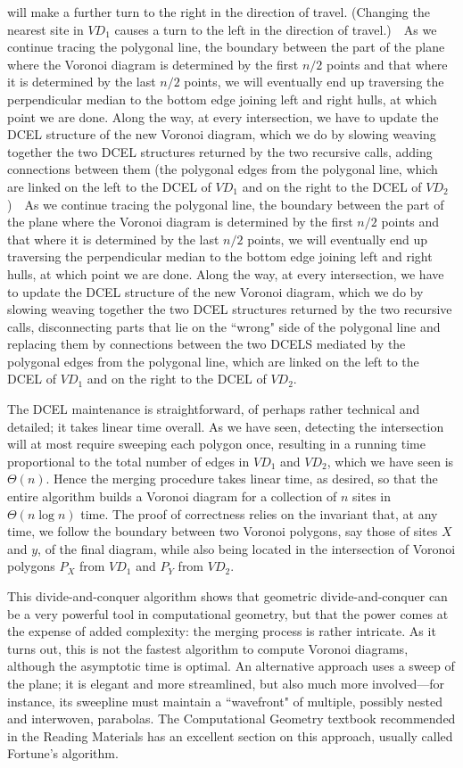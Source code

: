 \documentclass[11pt]{article}
\begin{document}
will make a further turn to the right in the direction of travel.   (Changing
the nearest site in $VD_1$ causes a turn to the left in the direction of
travel.)\ \ As we continue tracing the polygonal line, the boundary between
the part of the plane where the Voronoi diagram is determined by the first
$n/2$ points and that where it is determined by the last $n/2$ points, we
will eventually end up traversing the perpendicular median to the bottom
edge joining left and right hulls, at which point we are done.
Along the way, at every intersection, we have to update the DCEL structure of
the new Voronoi diagram, which we do by slowing weaving together the two
DCEL structures returned by the two recursive calls, adding connections between
them (the polygonal edges from the polygonal line, which are linked on the
left to the DCEL of $VD_1$ and on the right to the DCEL of $VD_2$)\ \ As we continue tracing the polygonal line, the boundary between
the part of the plane where the Voronoi diagram is determined by the first
$n/2$ points and that where it is determined by the last $n/2$ points, we
will eventually end up traversing the perpendicular median to the bottom
edge joining left and right hulls, at which point we are done.
Along the way, at every intersection, we have to update the DCEL structure of
the new Voronoi diagram, which we do by slowing weaving together the two DCEL
structures returned by the two recursive calls, disconnecting parts that lie on
the ``wrong" side of the polygonal line and replacing them by connections
between the two DCELS mediated by the polygonal edges from the polygonal line,
which are linked on the left to the DCEL of $VD_1$ and on the right to the DCEL
of $VD_2$.

The DCEL maintenance is straightforward, of perhaps rather technical and
detailed; it takes linear time overall.   As we have seen, detecting the
intersection will at most require sweeping each polygon once, resulting in
a running time proportional to the total number of edges in $VD_1$ and
$VD_2$, which we have seen is $\Theta(n)$.  Hence the merging procedure
takes linear time, as desired, so that the entire algorithm builds a Voronoi
diagram for a collection of $n$ sites in $\Theta(n\log n)$ time.
The proof of correctness relies on the invariant that, at any time,
we follow the boundary between two Voronoi polygons, say those of sites
$X$ and $y$, of the final diagram, while also being located in the
intersection of Voronoi polygons $P_X$ from $VD_1$ and $P_Y$ from $VD_2$.

This divide-and-conquer algorithm shows that geometric divide-and-conquer
can be a very powerful tool in computational geometry, but that the power
comes at the expense of added complexity: the merging process is rather
intricate.   As it turns out, this is not the fastest algorithm to compute
Voronoi diagrams, although the asymptotic time is optimal.  An alternative
approach uses a sweep of the plane; it is elegant and more streamlined,
but also much more involved---for instance, its sweepline must maintain
a ``wavefront" of multiple, possibly nested and interwoven, parabolas.
The Computational Geometry textbook recommended in the Reading Materials
has an excellent section on this approach, usually called Fortune's
algorithm.
\end{document}
